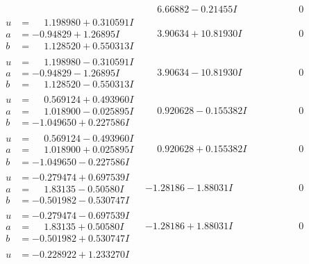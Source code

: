 \documentclass[1p]{elsarticle_modified}
\theoremstyle{definition}
\begin{document}
$$\begin{array}{c|c|c}
 & \phantom{-}6.66882 - 0.21455 I & \phantom{-0.000000 } 0 \\ \hline\begin{aligned}
u &= \phantom{-}1.198980 + 0.310591 I \\
a &= -0.94829 + 1.26895 I \\
b &= \phantom{-}1.128520 + 0.550313 I\end{aligned}
 & \phantom{-}3.90634 + 10.81930 I & \phantom{-0.000000 } 0 \\ \hline\begin{aligned}
u &= \phantom{-}1.198980 - 0.310591 I \\
a &= -0.94829 - 1.26895 I \\
b &= \phantom{-}1.128520 - 0.550313 I\end{aligned}
 & \phantom{-}3.90634 - 10.81930 I & \phantom{-0.000000 } 0 \\ \hline\begin{aligned}
u &= \phantom{-}0.569124 + 0.493960 I \\
a &= \phantom{-}1.018900 - 0.025895 I \\
b &= -1.049650 + 0.227586 I\end{aligned}
 & \phantom{-}0.920628 - 0.155382 I & \phantom{-0.000000 } 0 \\ \hline\begin{aligned}
u &= \phantom{-}0.569124 - 0.493960 I \\
a &= \phantom{-}1.018900 + 0.025895 I \\
b &= -1.049650 - 0.227586 I\end{aligned}
 & \phantom{-}0.920628 + 0.155382 I & \phantom{-0.000000 } 0 \\ \hline\begin{aligned}
u &= -0.279474 + 0.697539 I \\
a &= \phantom{-}1.83135 - 0.50580 I \\
b &= -0.501982 - 0.530747 I\end{aligned}
 & -1.28186 - 1.88031 I & \phantom{-0.000000 } 0 \\ \hline\begin{aligned}
u &= -0.279474 - 0.697539 I \\
a &= \phantom{-}1.83135 + 0.50580 I \\
b &= -0.501982 + 0.530747 I\end{aligned}
 & -1.28186 + 1.88031 I & \phantom{-0.000000 } 0 \\ \hline\begin{aligned}
u &= -0.228922 + 1.233270 I \\

\end{aligned}
\end{array}$$
\end{document}
